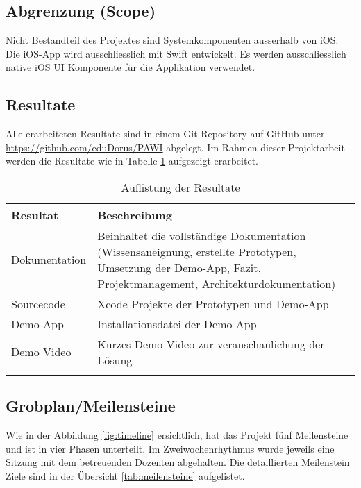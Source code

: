 \subsection{Abgrenzung (Scope)}
Nicht Bestandteil des Projektes sind Systemkomponenten ausserhalb von iOS. Die iOS-App wird ausschliesslich mit Swift entwickelt. Es werden ausschliesslich native iOS UI Komponente für die Applikation verwendet.

\subsection{Resultate}
Alle erarbeiteten Resultate sind in einem Git Repository auf GitHub unter \url{https://github.com/eduDorus/PAWI} abgelegt. Im Rahmen dieser Projektarbeit werden die Resultate wie in Tabelle \ref{tab:resultate} aufgezeigt erarbeitet. 
 
\begin{longtable}{l p{12.5cm}}
	\hline
	\textbf{Resultat} & \textbf{Beschreibung} \\
	\hline
	Dokumentation & Beinhaltet die vollständige Dokumentation (Wissensaneignung, erstellte Prototypen, Umsetzung der Demo-App, Fazit, Projektmanagement, Architekturdokumentation) \\
	Sourcecode & Xcode Projekte der Prototypen und Demo-App \\
	Demo-App & Installationsdatei der Demo-App \\
	Demo Video & Kurzes Demo Video zur veranschaulichung der Lösung \\
	\hline
	\caption{Auflistung der Resultate}
	\label{tab:resultate}
\end{longtable}

\subsection{Grobplan/Meilensteine}

Wie in der Abbildung \ref{fig:timeline} ersichtlich, hat das Projekt fünf Meilensteine und ist in vier Phasen unterteilt. Im Zweiwochenrhythmus wurde jeweils eine Sitzung mit dem betreuenden Dozenten abgehalten. Die detaillierten Meilenstein Ziele sind in der Übersicht \ref{tab:meilensteine} aufgelistet.

